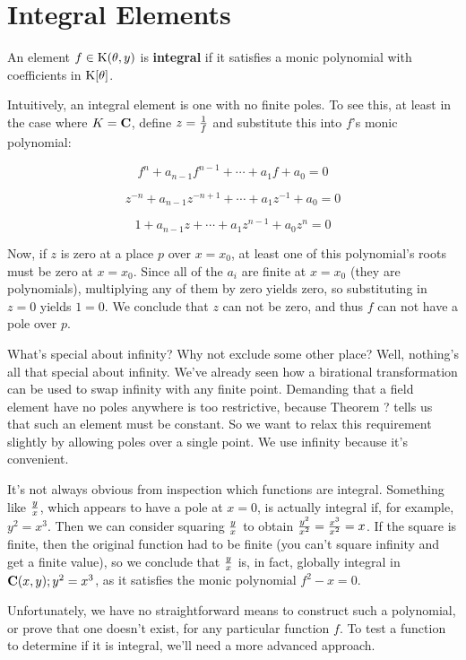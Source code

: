 
\section{Integral Elements}


An element $f \in {\rm K}(\theta,y)$ is {\bf integral} if it satisfies a
monic polynomial with coefficients in ${\rm K}[\theta]$.

\enddefinition

Intuitively, an integral element is one with no finite poles.
To see this, at least in the case where $K = {\bf C}$, define
$z = {1 \over f}$ and substitute this into $f$'s monic polynomial:

	$$f^n + a_{n-1} f^{n-1} + \cdots + a_1 f + a_0 = 0$$

	$$z^{-n} + a_{n-1} z^{-n+1} + \cdots + a_1 z^{-1} + a_0 = 0$$

	$$1 + a_{n-1} z + \cdots + a_1 z^{n-1} + a_0 z^n = 0$$

Now, if $z$ is zero at a place $p$ over $x=x_0$, at least one of this
polynomial's roots must be zero at $x=x_0$.  Since all of the $a_i$
are finite at $x=x_0$ (they are polynomials), multiplying any of them
by zero yields zero, so substituting in $z=0$ yields $1=0$. We
conclude that $z$ can not be zero, and thus $f$ can not have a pole
over $p$.

What's special about infinity?  Why not exclude some other place?
Well, nothing's all that special about infinity.  We've already seen
how a birational transformation can be used to swap infinity with any
finite point.  Demanding that a field element have no poles anywhere
is too restrictive, because Theorem ? tells us that such an element
must be constant.  So we want to relax this requirement slightly by
allowing poles over a single point.  We use infinity because it's
convenient.

It's not always obvious from inspection which functions are integral.
Something like $y \over x$, which appears to have a pole at $x=0$, is
actually integral if, for example, $y^2=x^3$.  Then we can consider
squaring $y \over x$ to obtain ${y^2 \over x^2} = {x^3 \over x^2} =
x$.  If the square is finite, then the original function had to be
finite (you can't square infinity and get a finite value), so we
conclude that $y \over x$ is, in fact, globally integral in ${\bf
C}(x,y); y^2=x^3$, as it satisfies the monic polynomial $f^2 - x = 0$.

Unfortunately, we have no straightforward means to construct such a
polynomial, or prove that one doesn't exist, for any particular
function $f$.  To test a function to determine if it is integral,
we'll need a more advanced approach.

